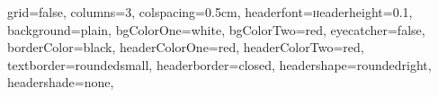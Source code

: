 \documentclass[a0paper,landscape,margin=100pt]{baposter}
\begin{document}
\begin{poster}{
grid=false,
columns=3,
colspacing=0.5cm,
headerfont=\textsc
headerheight=0.1\textheight,
background=plain,
bgColorOne=white,
bgColorTwo=red,
eyecatcher=false,
borderColor=black,
headerColorOne=red,
headerColorTwo=red,
textborder=roundedsmall,
headerborder=closed,
headershape=roundedright,
headershade=none,
}
\end{poster}
\end{document}
